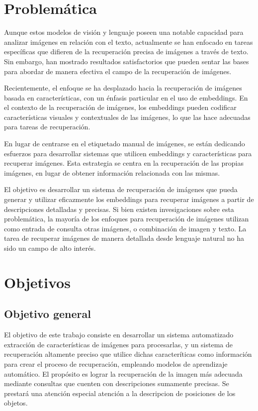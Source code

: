 \section*{Problem\'atica}
Aunque estos modelos de visión y lenguaje poseen una notable capacidad para analizar imágenes en relación con el texto, actualmente se han enfocado en tareas específicas que difieren de la recuperación precisa de im\'agenes a trav\'es de texto. Sin embargo, han mostrado resultados satisfactorios que pueden sentar las bases para abordar de manera efectiva el campo de la recuperación de imágenes.

Recientemente, el enfoque se ha desplazado hacia la recuperación de imágenes basada en características, con un énfasis particular en el uso de embeddings. En el contexto de la recuperación de imágenes, los embeddings pueden codificar características visuales y contextuales de las imágenes, lo que las hace adecuadas para tareas de recuperación.

En lugar de centrarse en el etiquetado manual de imágenes, se están dedicando esfuerzos para desarrollar sistemas que utilicen embeddings y características para recuperar imágenes. Esta estrategia se centra en la recuperación de las propias imágenes, en lugar de obtener información relacionada con las mismas.

El objetivo es desarrollar un sistema de recuperación de imágenes que pueda generar y utilizar eficazmente los embeddings para recuperar imágenes a partir de descripciones detalladas y precisas. Si bien existen invesigaciones sobre esta problem\'atica, la mayor\'ia de los enfoques para recuperaci\'on de im\'agenes utilizan como entrada de consulta otras im\'agenes, o combinaci\'on de imagen y texto. La tarea de recuperar im\'agenes de manera detallada desde lenguaje natural no ha sido un campo de alto inter\'es.

\section*{Objetivos}

\subsection*{Objetivo general}

El objetivo de este trabajo consiste en desarrollar un sistema automatizado extracci\'on de caracter\'isticas de im\'agenes para procesarlas, y un sistema de recuperaci\'on altamente preciso que utilice dichas caracter\'iticas como informaci\'on para crear el proceso de recuperaci\'on, empleando modelos de aprendizaje autom\'atico. El prop\'osito es lograr la recuperaci\'on de la imagen m\'as adecuada mediante consultas que cuenten con descripciones sumamente precisas. Se prestar\'a una atenci\'on especial atenci\'on a la descripcion de posiciones de los objetos.

